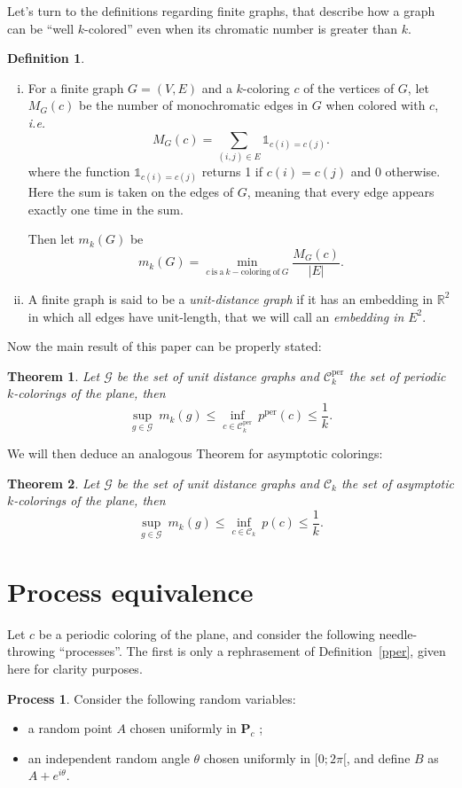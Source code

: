 \documentclass[a4paper,11pt]{article}
\newtheorem{theo}{Theorem}
\theoremstyle{definition}
\newtheorem{definition}{Definition}
\newtheorem{process}{Process}
\theoremstyle{remark}
\newcommand{\R}{\mathbb{R}}
\newcommand{\C}{\mathcal{C}}
\renewcommand{\P}{\mathbf{P}}
\newcommand{\pper}{p^{\mathrm{per}}}
\newcommand{\Cp}{\mathcal{C}^{\mathrm{per}}}
\begin{document}
Let's turn to the definitions regarding finite graphs, that describe how a graph
can be ``well $k$-colored'' even when its chromatic number is greater
than $k$.
\begin{definition}
\ 
\begin{enumerate}[i)]
\item For a finite graph $G=(V,E)$ and a $k$-coloring $c$ of the vertices of $G$, 
let $M_G(c)$ be the number of monochromatic edges in $G$ when colored with $c$, \textit{i.e.}
$$M_G(c) = \sum_{(i, j) \in E} \mathds{1}_{c(i)=c(j)}.$$
where the function $\mathds{1}_{c(i)=c(j)}$ returns 1 if $c(i)=c(j)$ and 0 otherwise. Here the sum is taken on the edges of $G$, meaning that every edge appears exactly one time in the sum.

Then let $m_k(G)$ be
\[m_k(G) = \min_{c \ \mathrm{is \ a} \ k-\mathrm{coloring \ of} \ G} \frac{M_G(c)}{|E|}.\]
\item A finite graph is said to be a \emph{unit-distance graph} if it has 
an embedding in $\R^2$ in which all edges have unit-length, that we will call an \textit{embedding in} $E^2$.
\end{enumerate}
\end{definition}
Now the main result of this paper can be properly stated:
\begin{theo} \label{ineg}
Let $\mathcal{G}$ be the set of unit distance graphs and $\Cp_k$ the set 
of periodic $k$-colorings of the plane, then
$$ \sup_{g \in \mathcal{G}} \ m_k(g) \leq \inf_{c \in \Cp_k} \ \pper(c) \leq \frac{1}{k}. $$
\end{theo}
We will then deduce an analogous Theorem for asymptotic 
colorings:
\begin{theo} \label{ineg2}
Let $\mathcal{G}$ be the set of unit distance graphs and $\C_k$ the set 
of asymptotic $k$-colorings of the plane, then
$$ \sup_{g \in \mathcal{G}} \ m_k(g) \leq \inf_{c \in \C_k} \ p(c) \leq \frac{1}{k}. $$
\end{theo}

\section{Process equivalence}
\label{equiv}

Let $c$ be a periodic coloring of the plane, and consider the following needle-throwing ``processes''. The first is only a rephrasement of Definition~\ref{pper}, given here for clarity purposes.
\begin{process} \label{premier}
Consider the following random variables:
\begin{itemize}
  \item a random point $A$ chosen uniformly 
  in $\P_c$ ;
  \item an independent random angle $\theta$ chosen uniformly in $[0;2 \pi[$, and define $B$ as $A + e^{i \theta}$.
\end{itemize}
\end{process}
\end{document}
